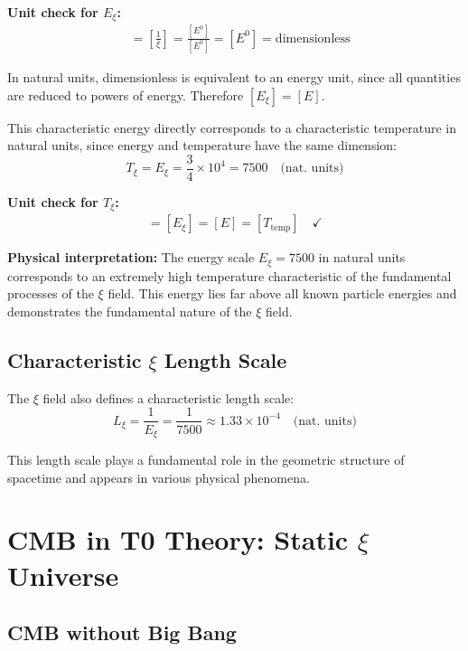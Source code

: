 	\textbf{Unit check for $E_\xi$:}
	\begin{align}
		[E_\xi] &= \left[\frac{1}{\xi}\right] = \frac{[E^0]}{[E^0]} = [E^0] = \text{dimensionless}
	\end{align}
	
	In natural units, dimensionless is equivalent to an energy unit, since all quantities are reduced to powers of energy. Therefore $[E_\xi] = [E]$.
	
	This characteristic energy directly corresponds to a characteristic temperature in natural units, since energy and temperature have the same dimension:
	\begin{equation}
		T_\xi = E_\xi = \frac{3}{4} \times 10^4 = 7500 \quad \text{(nat. units)}
	\end{equation}
	
	\textbf{Unit check for $T_\xi$:}
	\begin{align}
		[T_\xi] = [E_\xi] = [E] = [T_{\text{temp}}] \quad \checkmark
	\end{align}
	
	\textbf{Physical interpretation:} The energy scale $E_\xi = 7500$ in natural units corresponds to an extremely high temperature characteristic of the fundamental processes of the $\xi$ field. This energy lies far above all known particle energies and demonstrates the fundamental nature of the $\xi$ field.
	
	\subsection{Characteristic $\xi$ Length Scale}
	
	The $\xi$ field also defines a characteristic length scale:
	\begin{equation}
		L_\xi = \frac{1}{E_\xi} = \frac{1}{7500} \approx 1.33 \times 10^{-4} \quad \text{(nat. units)}
	\end{equation}
	
	This length scale plays a fundamental role in the geometric structure of spacetime and appears in various physical phenomena.
	
	\section{CMB in T0 Theory: Static $\xi$ Universe}
	
	\subsection{CMB without Big Bang}
	
